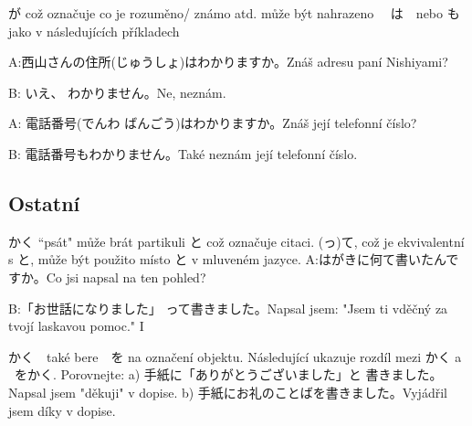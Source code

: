が což označuje co je rozuměno/ známo atd. může být nahrazeno 　は　nebo も jako v následujících příkladech

A:西山さんの住所(じゅうしょ)はわかりますか。Znáš adresu paní Nishiyami?

B: いえ、 わかりません。Ne, neznám.

A: 電話番号(でんわ ばんごう)はわかりますか。Znáš její telefonní číslo?

B: 電話番号もわかりません。Také neznám její telefonní číslo.


\subsection{Ostatní}
かく “psát" může brát partikuli と což označuje citaci. (っ)て, což je ekvivalentní s  と, může být použito místo  と v mluveném jazyce.
A:はがきに何て書いたんですか。Co jsi napsal na ten pohled?

B:「お世話になりました」 って書きました。Napsal jsem: "Jsem ti vděčný za tvojí laskavou pomoc."
I

かく　také bere　を na označení objektu. Následující ukazuje rozdíl mezi  かく a ~をかく.
Porovnejte:
a) 手紙に「ありがとうございました」と 書きました。Napsal jsem "děkuji" v dopise.
b) 手紙にお礼のことばを書きました。Vyjádřil jsem díky v dopise.
























